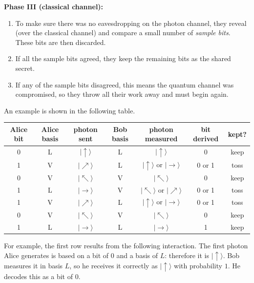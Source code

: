 \documentclass{article}
\theoremstyle{plain}
\theoremstyle{definition}
\theoremstyle{remark}
\numberwithin{theorem}{section}
\begin{document}
        \textbf{Phase III (classical channel):}
    \begin{enumerate}
    \item  To make sure there was no eavesdropping on the photon channel, they reveal (over the classical channel) and compare a small number of \emph{sample bits}.  These bits are then discarded.  
    \item If all the sample bits agreed, they keep the remaining bits as the shared secret.  
    \item If any of the sample bits disagreed, this means the quantum channel was compromised, so they throw all their work away and must begin again.
    \end{enumerate}

An example is shown in the following table.  
\vspace{1em}

\begin{center}

\begin{tabular}{ccccccc}
Alice bit & Alice basis & photon sent & Bob basis & photon measured & bit derived & kept? \\
\hline
0 & L & $| \uparrow \rangle$ & L & $| \uparrow \rangle$ & 0 & keep \\
1 & V & $| \nearrow \rangle$ & L & $| \uparrow \rangle$ or $| \rightarrow \rangle$ & 0 or 1 & toss \\
0 & V & $| \nwarrow \rangle$ & V & $| \nwarrow \rangle$ & 0 & keep \\
1 & L & $| \rightarrow \rangle$ & V & $| \nwarrow \rangle$ or $| \nearrow \rangle$ & 0 or 1 & toss\\
1 & V & $| \nearrow \rangle$ & L & $| \uparrow \rangle$ or $| \rightarrow \rangle$ & 0 or 1 & toss\\
0 & V & $| \nwarrow \rangle$ & V & $| \nwarrow \rangle$ & 0  & keep\\
1 & L & $| \rightarrow \rangle$ & L & $| \rightarrow \rangle$ & 1 & keep\\
\end{tabular}

\end{center}
\vspace{1em}

For example, the first row results from the following interaction.  The first photon Alice generates is based on a bit of $0$ and a basis of $L$:  therefore it is $| \uparrow \rangle$.  Bob measures it in basis $L$, so he receives it correctly as $| \uparrow \rangle$ with probability $1$.  He decodes this as a bit of $0$.
\end{document}
